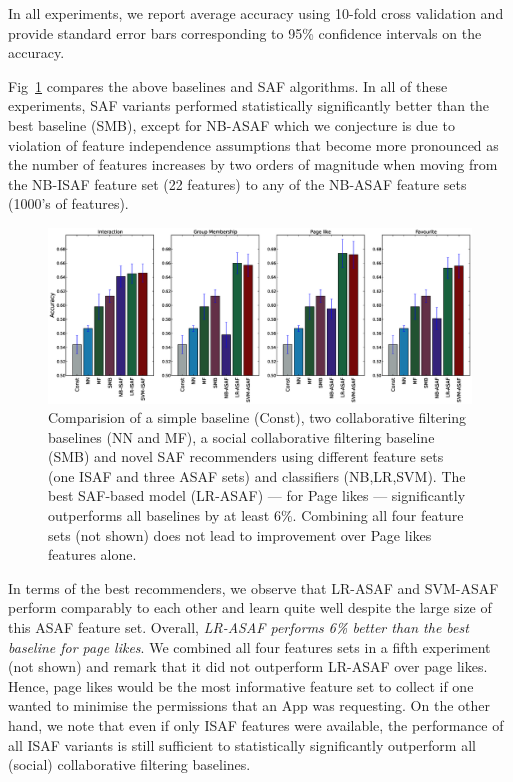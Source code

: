 In all experiments, we report average accuracy using 10-fold cross
validation and provide standard error bars corresponding to 95\% confidence
intervals on the accuracy.

Fig~\ref{Fig1} compares the above baselines and SAF algorithms.  In
all of these experiments, SAF variants performed statistically
significantly better than the best baseline (SMB), except for NB-ASAF
which we conjecture is due to violation of feature independence
assumptions that become more pronounced as the number of features
increases by two orders of magnitude when moving from the NB-ISAF
feature set (22 features) to any of the NB-ASAF feature sets (1000's
of features).

\begin{figure}[tbp!]
\hspace{-6mm}\includegraphics[width=190mm]{data/plots/accuracy/accuracyLargeNew.eps}
\caption{Comparision of a simple baseline (Const), two collaborative
  filtering baselines (NN and MF), a social collaborative filtering
  baseline (SMB) and novel SAF recommenders using different feature
  sets (one ISAF and three ASAF sets) and classifiers (NB,LR,SVM).
  The best SAF-based model (LR-ASAF) --- for Page likes --- significantly outperforms
  all baselines by at least 6\%.  Combining all four feature sets (not shown)
  does not lead to improvement over Page likes features alone.}
\label{Fig1}
\end{figure}

In terms of the best recommenders, we observe that LR-ASAF and
SVM-ASAF perform comparably to each other and learn quite well despite
the large size of this ASAF feature set.  Overall, \emph{LR-ASAF
  performs 6\% better than the best baseline for page likes}.  We
combined all four features sets in a fifth experiment (not shown) and
remark that it did not outperform LR-ASAF over page
likes.  Hence, page likes would be the most informative
feature set to collect if one wanted to minimise the permissions that
an App was requesting.  On the other hand, we note that even if only
ISAF features were available, the performance of all ISAF variants is
still sufficient to statistically significantly outperform all
(social) collaborative filtering baselines.

